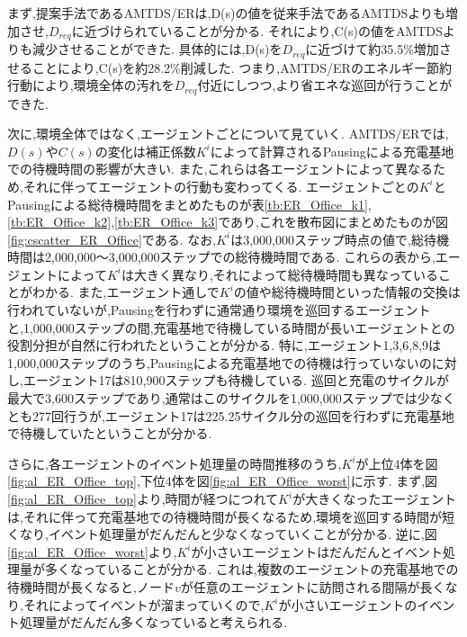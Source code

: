 \documentclass[12pt,a4j,twoside]{jarticle}
\begin{document}
  \par
  まず,提案手法であるAMTDS/ERは,D(s)の値を従来手法であるAMTDSよりも増加させ,$D_{req}$に近づけられていることが分かる.
  それにより,C(s)の値をAMTDSよりも減少させることができた.
  具体的には,D(s)を$D_{req}$に近づけて約35.5\%増加させることにより,C(s)を約28.2\%削減した.
  つまり,AMTDS/ERのエネルギー節約行動により,環境全体の汚れを$D_{req}$付近にしつつ,より省エネな巡回が行うことができた.
  
  \par
  次に,環境全体ではなく,エージェントごとについて見ていく.
  AMTDS/ERでは,$D(s)$や$C(s)$の変化は補正係数$K^i$によって計算されるPausingによる充電基地での待機時間の影響が大きい.
  また,これらは各エージェントによって異なるため,それに伴ってエージェントの行動も変わってくる.
  エージェントごとの$K^i$とPausingによる総待機時間をまとめたものが表\ref{tb:ER_Office_k1},\ref{tb:ER_Office_k2},\ref{tb:ER_Office_k3}であり,これを散布図にまとめたものが図\ref{fig:cscatter_ER_Office}である.
  なお,$K^i$は3,000,000ステップ時点の値で,総待機時間は2,000,000～3,000,000ステップでの総待機時間である.
  これらの表から,エージェントによって$K^i$は大きく異なり,それによって総待機時間も異なっていることがわかる.
  また,エージェント通しで$K^i$の値や総待機時間といった情報の交換は行われていないが,Pausingを行わずに通常通り環境を巡回するエージェントと,1,000,000ステップの間,充電基地で待機している時間が長いエージェントとの役割分担が自然に行われたということが分かる.
  特に,エージェント1,3,6,8,9は1,000,000ステップのうち,Pausingによる充電基地での待機は行っていないのに対し,エージェント17は810,900ステップも待機している.
  巡回と充電のサイクルが最大で3,600ステップであり,通常はこのサイクルを1,000,000ステップでは少なくとも277回行うが,エージェント17は225.25サイクル分の巡回を行わずに充電基地で待機していたということが分かる.
  
  \par
  さらに,各エージェントのイベント処理量の時間推移のうち,$K^i$が上位4体を図\ref{fig:al_ER_Office_top},下位4体を図\ref{fig:al_ER_Office_worst}に示す.
  まず,図\ref{fig:al_ER_Office_top}より,時間が経つにつれて$K^i$が大きくなったエージェントは,それに伴って充電基地での待機時間が長くなるため,環境を巡回する時間が短くなり,イベント処理量がだんだんと少なくなっていくことが分かる.
  逆に,図\ref{fig:al_ER_Office_worst}より,$K^i$が小さいエージェントはだんだんとイベント処理量が多くなっていることが分かる.
  これは,複数のエージェントの充電基地での待機時間が長くなると,ノード$v$が任意のエージェントに訪問される間隔が長くなり,それによってイベントが溜まっていくので,$K^i$が小さいエージェントのイベント処理量がだんだん多くなっていると考えられる.
\end{document}
